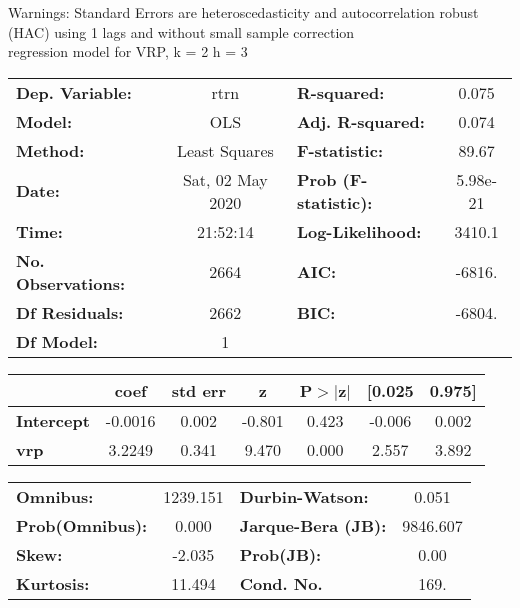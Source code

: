 Warnings: \newline
 [1] Standard Errors are heteroscedasticity and autocorrelation robust (HAC) using 1 lags and without small sample correction\\ 

regression model for VRP, k = 2 h = 3\begin{center}
\begin{tabular}{lclc}
\toprule
\textbf{Dep. Variable:}    &       rtrn       & \textbf{  R-squared:         } &     0.075   \\
\textbf{Model:}            &       OLS        & \textbf{  Adj. R-squared:    } &     0.074   \\
\textbf{Method:}           &  Least Squares   & \textbf{  F-statistic:       } &     89.67   \\
\textbf{Date:}             & Sat, 02 May 2020 & \textbf{  Prob (F-statistic):} &  5.98e-21   \\
\textbf{Time:}             &     21:52:14     & \textbf{  Log-Likelihood:    } &    3410.1   \\
\textbf{No. Observations:} &        2664      & \textbf{  AIC:               } &    -6816.   \\
\textbf{Df Residuals:}     &        2662      & \textbf{  BIC:               } &    -6804.   \\
\textbf{Df Model:}         &           1      & \textbf{                     } &             \\
\bottomrule
\end{tabular}
\begin{tabular}{lcccccc}
                   & \textbf{coef} & \textbf{std err} & \textbf{z} & \textbf{P$> |$z$|$} & \textbf{[0.025} & \textbf{0.975]}  \\
\midrule
\textbf{Intercept} &      -0.0016  &        0.002     &    -0.801  &         0.423        &       -0.006    &        0.002     \\
\textbf{vrp}       &       3.2249  &        0.341     &     9.470  &         0.000        &        2.557    &        3.892     \\
\bottomrule
\end{tabular}
\begin{tabular}{lclc}
\textbf{Omnibus:}       & 1239.151 & \textbf{  Durbin-Watson:     } &    0.051  \\
\textbf{Prob(Omnibus):} &   0.000  & \textbf{  Jarque-Bera (JB):  } & 9846.607  \\
\textbf{Skew:}          &  -2.035  & \textbf{  Prob(JB):          } &     0.00  \\
\textbf{Kurtosis:}      &  11.494  & \textbf{  Cond. No.          } &     169.  \\
\bottomrule
\end{tabular}
\end{center}

